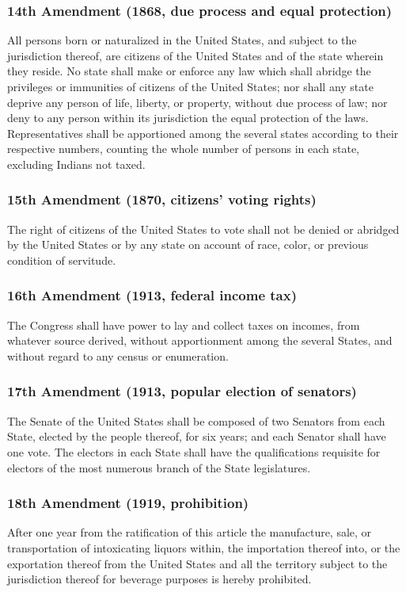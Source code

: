 \documentclass[aspectratio=169]{beamer}
\theoremstyle{principle}
\begin{document}
\begin{frame}
\frametitle{14th Amendment (1868, due process and equal protection)}
All persons born or naturalized in the United States, and subject to the jurisdiction thereof, are citizens of the United States and of the state wherein they reside. No state shall make or enforce any law which shall abridge the privileges or immunities of citizens of the United States; nor shall any state deprive any person of life, liberty, or property, without due process of law; nor deny to any person within its jurisdiction the equal protection of the laws.\\
\bigskip
Representatives shall be apportioned among the several states according to their respective numbers, counting the whole number of persons in each state, excluding Indians not taxed.
\end{frame}

\begin{frame}
\frametitle{15th Amendment (1870, citizens' voting rights)}
The right of citizens of the United States to vote shall not be denied or abridged by the United States or by any state on account of race, color, or previous condition of servitude.
\end{frame}

\begin{frame}
\frametitle{16th Amendment (1913, federal income tax)}
The Congress shall have power to lay and collect taxes on incomes, from whatever source derived, without apportionment among the several States, and without regard to any census or enumeration.
\end{frame}

\begin{frame}
\frametitle{17th Amendment (1913, popular election of senators)}
The Senate of the United States shall be composed of two Senators from each State, elected by the people thereof, for six years; and each Senator shall have one vote. The electors in each State shall have the qualifications requisite for electors of the most numerous branch of the State legislatures.
\end{frame}

\begin{frame}
\frametitle{18th Amendment (1919, prohibition)}
After one year from the ratification of this article the manufacture, sale, or transportation of intoxicating liquors within, the importation thereof into, or the exportation thereof from the United States and all the territory subject to the jurisdiction thereof for beverage purposes is hereby prohibited. 
\end{frame}
\end{document}
